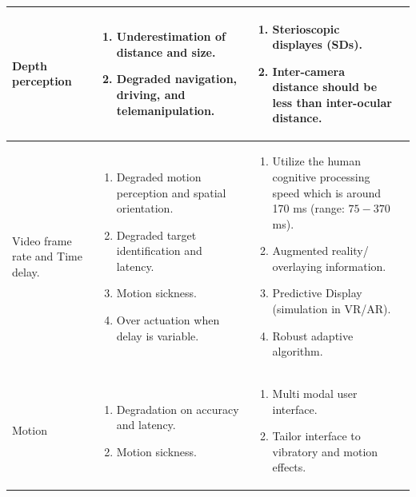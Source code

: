 \begin{longtable}{p{2.5cm} p{5cm} p{5cm} p{1cm}}
        \rowcolor{lightgray} Depth perception &
           \begin{enumerate}
           \item Underestimation of distance and size.
           \item Degraded navigation, driving, and telemanipulation.
           \end{enumerate} &
            \begin{enumerate}
            \item Sterioscopic displayes (SDs).
            \item Inter-camera distance should be less than inter-ocular distance.
            \end{enumerate} &  \cite{Bowman:2004:UIT:993837} \cite{fitts1967human} \cite{Chen2007HumanPI}\\
        \hline 
        
        Video frame rate and Time delay.
         &
           \begin{enumerate}
           \item Degraded motion perception and spatial orientation.
           \item Degraded target identification and latency.
           \item Motion sickness.
           \item Over actuation when delay is variable.
           \end{enumerate} &
            \begin{enumerate}
           \item Utilize the human cognitive processing speed which is around 170 ms (range: $75-370$ ms).
            \item Augmented reality/ overlaying information.
            \item Predictive Display (simulation in VR/AR).
            \item Robust adaptive algorithm.
            \end{enumerate} &  \cite{madl2011timing} \cite{Chen2007HumanPI} \cite{kebria2019robust} \\
      
        \hline
      \rowcolor{lightgray} Motion &
           \begin{enumerate}
           \item Degradation on accuracy and latency.
           \item Motion sickness.
           \end{enumerate} &
            \begin{enumerate}
            \item Multi modal user interface.
            \item Tailor interface to vibratory and motion effects.
            \end{enumerate} &  \cite{kamsickas2003future} \cite{schipani1998quantification}\\
        \hline


\end{longtable}
